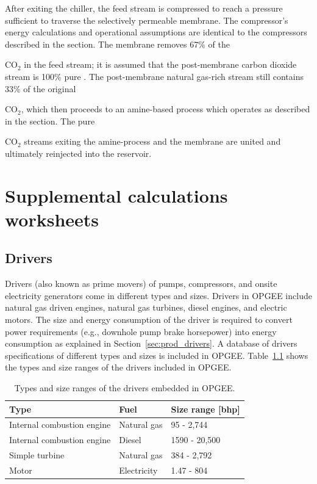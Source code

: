 \documentclass[11pt]{report}
\begin{document}
{After exiting the chiller, the feed stream is compressed to reach a pressure sufficient to traverse the selectively permeable membrane. The compressor's energy calculations and operational assumptions are identical to the compressors described in the  section. The membrane removes 67\% of the {CO$_{2}$ in the feed stream; it is assumed that the post-membrane carbon dioxide stream is 100\% pure \cite{NETLChillerModel}. The post-membrane natural gas-rich stream still contains 33\% of the original {CO$_{2}$, which then proceeds to an amine-based process which operates as described in the  section. The pure {CO$_{2}$ streams exiting the amine-process and the membrane are united and ultimately reinjected into the reservoir.








\chapter{Supplemental calculations worksheets}


\section{Drivers} \label{sec:drivers}

Drivers (also known as prime movers) of pumps, compressors, and onsite electricity generators come in different types and sizes. Drivers in OPGEE include natural gas driven engines, natural gas turbines, diesel engines, and electric motors. The size and energy consumption of the driver is required to convert power requirements (e.g., downhole pump brake horsepower) into energy consumption as explained in Section \,\ref{sec:prod_drivers}. A database of drivers specifications of different types and sizes is included in OPGEE. Table \,\ref{tab:drivers_size} shows the types and size ranges of the drivers included in OPGEE.
\begin{table}
\begin{scriptsize}
\caption{Types and size ranges of the drivers embedded in OPGEE.}
\label{tab:drivers_size}
\begin{tabular*}{1\columnwidth}{p{}p{}p{}}
\toprule
Type & Fuel & Size range [bhp] \\
\midrule
Internal combustion engine & Natural gas & 95 - 2,744 \\
Internal combustion engine & Diesel & 1590 - 20,500 \\
Simple turbine & Natural gas & 384 - 2,792 \\
Motor & Electricity & 1.47 - 804 \\
\bottomrule
\end{tabular*}
\end{scriptsize}
\end{table}

}}}}
\end{document}

